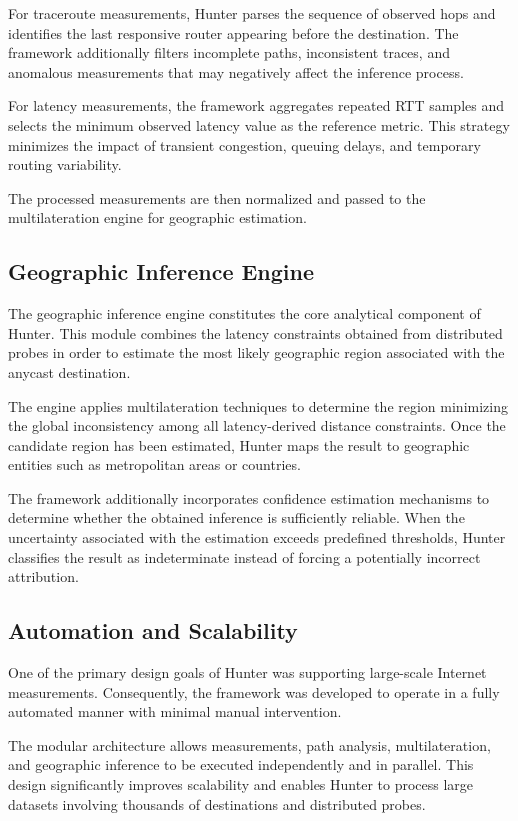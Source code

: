 For traceroute measurements, Hunter parses the sequence of observed hops and identifies the last responsive router appearing before the destination. The framework additionally filters incomplete paths, inconsistent traces, and anomalous measurements that may negatively affect the inference process.

For latency measurements, the framework aggregates repeated RTT samples and selects the minimum observed latency value as the reference metric. This strategy minimizes the impact of transient congestion, queuing delays, and temporary routing variability.

The processed measurements are then normalized and passed to the multilateration engine for geographic estimation.

\subsection{Geographic Inference Engine}

The geographic inference engine constitutes the core analytical component of Hunter. This module combines the latency constraints obtained from distributed probes in order to estimate the most likely geographic region associated with the anycast destination.

The engine applies multilateration techniques to determine the region minimizing the global inconsistency among all latency-derived distance constraints. Once the candidate region has been estimated, Hunter maps the result to geographic entities such as metropolitan areas or countries.

The framework additionally incorporates confidence estimation mechanisms to determine whether the obtained inference is sufficiently reliable. When the uncertainty associated with the estimation exceeds predefined thresholds, Hunter classifies the result as indeterminate instead of forcing a potentially incorrect attribution.

\subsection{Automation and Scalability}

One of the primary design goals of Hunter was supporting large-scale Internet measurements. Consequently, the framework was developed to operate in a fully automated manner with minimal manual intervention.

The modular architecture allows measurements, path analysis, multilateration, and geographic inference to be executed independently and in parallel. This design significantly improves scalability and enables Hunter to process large datasets involving thousands of destinations and distributed probes.

